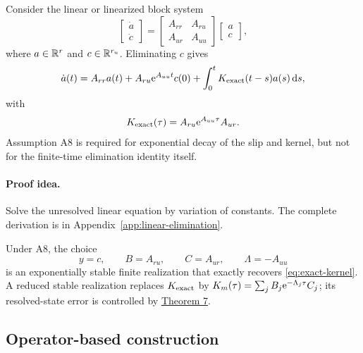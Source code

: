 \label{thm:linear-elimination}
\begin{theoremfive}
Consider the linear or linearized block system
\begin{equation}
 \begin{bmatrix}\dot a\\\dot c\end{bmatrix}
 =
 \begin{bmatrix}
 A_{rr}&A_{ru}\\
 A_{ur}&A_{uu}
 \end{bmatrix}
 \begin{bmatrix}a\\c\end{bmatrix},
 \label{eq:block-linear}
\end{equation}
where $a\in\mathbb{R}^r$ and $c\in\mathbb{R}^{r_u}$. Eliminating $c$ gives
\begin{equation}
 \dot a(t)=A_{rr}a(t)+A_{ru}\mathrm{e}^{A_{uu}t}c(0)
 +\int_0^tK_{\rm exact}(t-s)a(s)\,\mathrm{d} s,
 \label{eq:exact-linear-memory}
\end{equation}
with
\begin{equation}
 K_{\rm exact}(\tau)=A_{ru}\mathrm{e}^{A_{uu}\tau}A_{ur}.
 \label{eq:exact-kernel}
\end{equation}
Assumption A8 is required for exponential decay of the slip and kernel, but
not for the finite-time elimination identity itself.
\end{theoremfive}

\paragraph{Proof idea.}
Solve the unresolved linear equation by variation of constants. The complete
derivation is in Appendix~\ref{app:linear-elimination}.

\label{cor:exact-realization}
\begin{corollarythree}
Under A8, the choice
\begin{equation}
 y=c,\qquad B=A_{ru},\qquad C=A_{ur},\qquad \Lambda=-A_{uu}
 \label{eq:exact-realization}
\end{equation}
is an exponentially stable finite realization that exactly recovers
\eqref{eq:exact-kernel}. A reduced stable realization replaces
$K_{\rm exact}$ by
$K_m(\tau)=\sum_jB_j\mathrm{e}^{-\Lambda_j\tau}C_j$; its resolved-state error is
controlled by \hyperref[thm:kernel-error]{Theorem 7}.
\end{corollarythree}

\subsection{Operator-based construction}
\label{sec:operator-construction}


